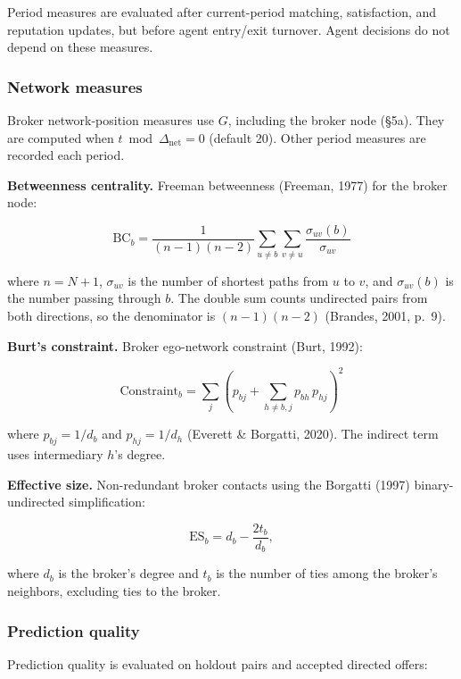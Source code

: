 \documentclass[11pt]{article}
\begin{document}
Period measures are evaluated after current-period matching, satisfaction, and reputation updates, but before agent entry/exit turnover. Agent decisions do not depend on these measures.

\subsubsection{Network measures}\label{network-measures}

Broker network-position measures use \(G\), including the broker node (§5a). They are computed when \(t \bmod \Delta_{\mathrm{net}}=0\) (default 20). Other period measures are recorded each period.

\textbf{Betweenness centrality.} Freeman betweenness (Freeman, 1977) for the broker node:

\[\mathrm{BC}_b = \frac{1}{(n-1)(n-2)} \sum_{u \neq b} \sum_{v \neq u} \frac{\sigma_{uv}(b)}{\sigma_{uv}}\]

where \(n = N+1\), \(\sigma_{uv}\) is the number of shortest paths from \(u\) to \(v\), and \(\sigma_{uv}(b)\) is the number passing through \(b\). The double sum counts undirected pairs from both directions, so the denominator is \((n-1)(n-2)\) (Brandes, 2001, p.~9).

\textbf{Burt's constraint.} Broker ego-network constraint (Burt, 1992):

\[\mathrm{Constraint}_b = \sum_j \left(p_{bj} + \sum_{h \neq b,j}
p_{bh}\, p_{hj}\right)^2\]

where \(p_{bj} = 1/d_b\) and \(p_{hj} = 1/d_h\) (Everett \& Borgatti, 2020). The indirect term uses intermediary \(h\)'s degree.

\textbf{Effective size.} Non-redundant broker contacts using the Borgatti (1997) binary-undirected simplification:

\[\text{ES}_b = d_b - \frac{2t_b}{d_b},\]

where \(d_b\) is the broker's degree and \(t_b\) is the number of ties among the broker's neighbors, excluding ties to the broker.

\subsubsection{Prediction quality}\label{prediction-quality}

Prediction quality is evaluated on holdout pairs and accepted directed offers:
\end{document}
